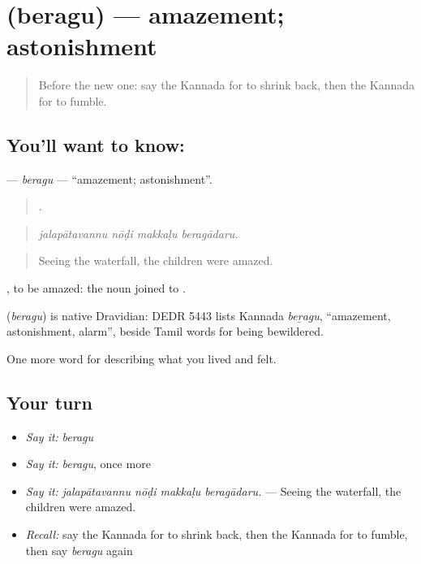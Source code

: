 \section[\texorpdfstring{\kn{ಬೆರಗು} (beragu)}{ಬೆರಗು (beragu)}]{ (beragu) — amazement; astonishment}

\label{lesson:KA-C494-beragu}



\begin{quote}
Before the new one: say the Kannada for to shrink back, then the Kannada for to fumble.
\end{quote}

\subsection*{You'll want to know: }
\textbf{} — \emph{beragu} — \textquotedblleft{}amazement; astonishment\textquotedblright{}.

\begin{quote}
   .
\end{quote}

\begin{quote}
\emph{jalapātavannu nōḍi makkaḷu beragādaru.}
\end{quote}

\begin{quote}
Seeing the waterfall, the children were amazed.
\end{quote}

, to be amazed: the noun joined to .

\begin{cousinweb}
\textbf{} (\emph{beragu}) is native Dravidian: DEDR 5443 lists Kannada \emph{beṟagu}, \textquotedblleft{}amazement, astonishment, alarm\textquotedblright{}, beside Tamil words for being bewildered.
\end{cousinweb}

\begin{grammarlens}[title={What you've built}]
One more word for describing what you lived and felt.
\end{grammarlens}

\subsection*{Your turn}
\begin{itemize}
\raggedright
  \item \emph{Say it:} \emph{beragu}
  \item \emph{Say it:} \emph{beragu}, once more
  \item \emph{Say it:} \emph{jalapātavannu nōḍi makkaḷu beragādaru.} — Seeing the waterfall, the children were amazed.
  \item \emph{Recall:} say the Kannada for to shrink back, then the Kannada for to fumble, then say \emph{beragu} again
\end{itemize}

